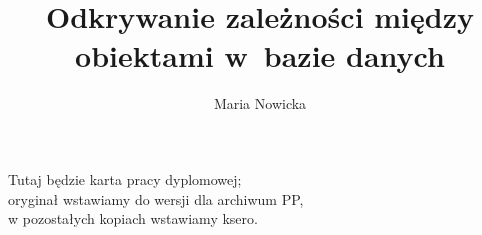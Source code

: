 \documentclass[polish,master,a4paper,oneside]{ppfcmthesis}
\author{Maria Nowicka \album{151851}}
\title{Odkrywanie zależności między obiektami w~bazie danych}
\begin{document}
\frontmatter\pagestyle{empty}%
\maketitle\cleardoublepage%

\thispagestyle{empty}\vspace*{\fill}%
\begin{center}
  Tutaj będzie karta pracy dyplomowej;\\
  oryginał wstawiamy do wersji dla archiwum PP,\\
  w pozostałych kopiach wstawiamy ksero.
\end{center}%
\vfill\cleardoublepage%





\end{document}
